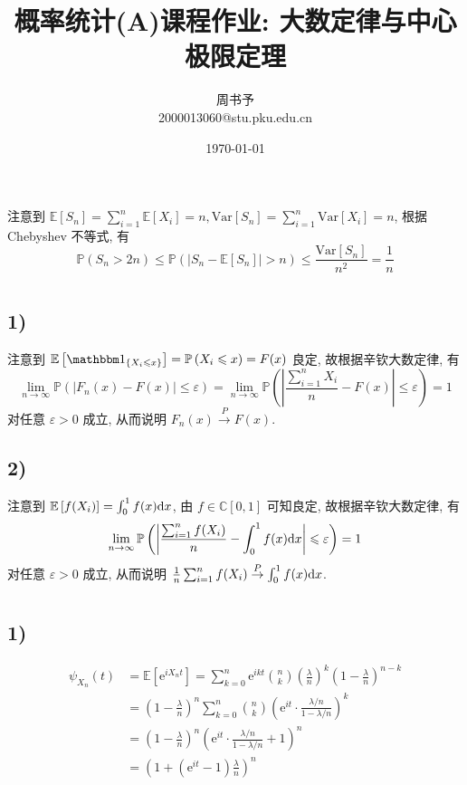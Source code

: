 \documentclass[8pt]{article}
\title{\heiti\zihao{2} 概率统计(A)课程作业: 大数定律与中心极限定理}
\author{\kaishu\zihao{-3} 周书予\\2000013060@stu.pku.edu.cn}
\date{\today}
\theoremstyle{compact}
\def\le{\leqslant}
\def\P#1{\mathbb{P}\left({#1}\right)}
\def\e{\mathrm{e}}
\def\E#1{\mathbb{E}\left[{#1}\right]}
\def\Var#1{\text{Var}\left[{#1}\right]}
\begin{document}
\pagestyle{plain}

\maketitle

\section{}
注意到 $\E{S_n} = \sum_{i=1}^{n}\E{X_i} = n, \Var{S_n} = \sum_{i=1}^{n}\Var{X_i} = n$, 根据 Chebyshev 不等式, 有
$$\P{S_n > 2n} \le \P{|S_n - \E{S_n}| > n} \le \frac{\Var{S_n}}{n^2} = \frac1n$$

\section{}
\subsection*{1)}
注意到 $\E{\mathbbm 1_{\{X_i \le x\}}} = \P{X_i \le x} = F(x)$ 良定, 故根据辛钦大数定律, 有$$\lim_{n \to \infty}\P{\left|F_n(x) - F(x)\right| \le \varepsilon} = \lim_{n \to \infty}\P{\left|\frac{\sum_{i=1}^{n}X_i}{n} - F(x)\right| \le \varepsilon} = 1$$
对任意 $\varepsilon > 0$ 成立, 从而说明 $F_n(x) \overset{P}{\to} F(x)$.
\subsection*{2)}
注意到 $\E{f(X_i)} = \int_0^{1}f(x)\text dx$, 由 $f \in \mathbb C[0, 1]$ 可知良定, 故根据辛钦大数定律, 有$$\lim_{n \to \infty} \P{\left| \frac{\sum_{i=1}^{n}f(X_i)}{n} - \int_0^{1}f(x)\text dx \right| \le \varepsilon} = 1$$
对任意 $\varepsilon > 0$ 成立, 从而说明 $\frac1n\sum_{i=1}^{n}f(X_i) \overset{P}{\to} \int_0^1f(x)\text dx$.

\section{}
\subsection*{1)}
\begin{equation*}
	\begin{split}
		\psi_{X_n}(t) &= \E{\e^{iX_nt}} = \sum_{k=0}^{n}\e^{ikt}\binom{n}{k}\left(\frac{\lambda}{n}\right)^k\left(1-\frac{\lambda}{n}\right)^{n-k}\\
		&= \left(1-\frac{\lambda}{n}\right)^n \sum_{k=0}^{n}\binom{n}{k}\left(\e^{it}\cdot \frac{\lambda/n}{1 - \lambda/n}\right)^k\\
		&= \left(1-\frac{\lambda}{n}\right)^n\left(\e^{it}\cdot \frac{\lambda/n}{1 - \lambda/n} + 1\right)^n\\
		&= \left(1 + (\e^{it} - 1)\frac{\lambda}{n}\right)^n
	\end{split}
\end{equation*}
\end{document}
